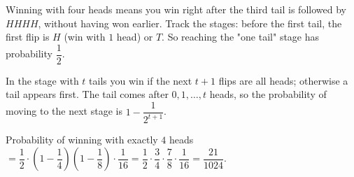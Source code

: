 Winning with four heads means you win right after the third tail is followed by $HHHH$, without having won earlier. Track the stages: before the first tail, the first flip is $H$ (win with $1$ head) or $T$. So reaching the "one tail" stage has probability $\dfrac12$.

In the stage with $t$ tails you win if the next $t+1$ flips are all heads; otherwise a tail appears first. The tail comes after $0,1,\dots,t$ heads, so the probability of moving to the next stage is $1-\dfrac1{2^{t+1}}$.

Probability of winning with exactly $4$ heads $=\dfrac12\cdot\left(1-\dfrac14\right)\left(1-\dfrac18\right)\cdot\dfrac1{16}=\dfrac12\cdot\dfrac34\cdot\dfrac78\cdot\dfrac1{16}=\boxed{\dfrac{21}{1024}}$.
